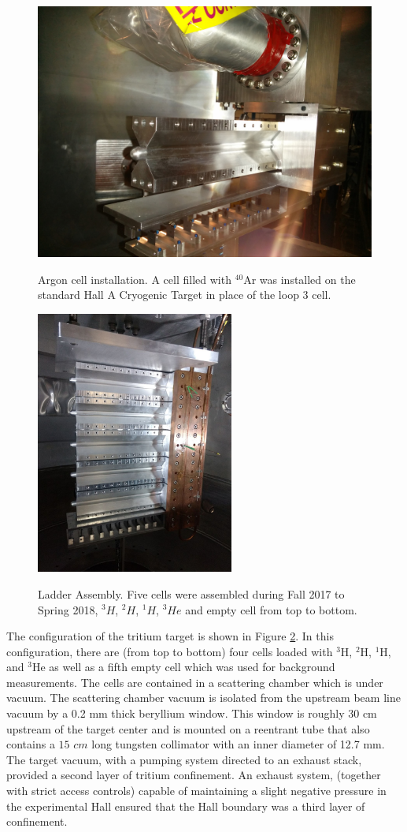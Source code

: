 \documentclass[final,5p,times,twocolumn]{elsarticle}
\begin{document}
\begin{figure}[htbp]
	\centering
	\includegraphics[width=6.5 cm]{Ar-cell.jpg}\\
	\caption{Argon cell installation. A cell filled with $^{40}$Ar was installed on the standard Hall A Cryogenic Target in place of the loop 3 cell.}
	\label{argon}
\end{figure}

\begin{figure}[htbp]
  \centering
  \includegraphics[width=6.5cm]{ladder.jpg}\\
  \caption{Ladder Assembly. Five cells were assembled during Fall 2017 to Spring 2018, $^{3}H$, $^{2}H$, $^{1}H $, $^{3}He$ and empty cell from top to bottom.}
  \label{ladder}
\end{figure}

The configuration of the tritium target is shown in Figure \ref{ladder}. In this configuration, there are (from top to bottom) four cells loaded with $^{3}$H, $^{2}$H, $^{1}$H, and $^{3}$He as well as a fifth empty cell which was used for background measurements. The cells are contained in a scattering chamber which is under vacuum. The scattering chamber vacuum is isolated from the upstream beam line vacuum by a 0.2 mm thick beryllium window. This window is roughly 30 cm upstream of the target center and is mounted on a reentrant tube that also contains a $15$ $cm$ long tungsten collimator with an inner diameter of 12.7 mm. The target vacuum, with a pumping system directed to an exhaust stack, provided a second layer of tritium confinement. An exhaust system, (together with strict access controls) capable of maintaining a slight negative pressure in the experimental Hall ensured that the Hall boundary was a third layer of confinement.
\end{document}
